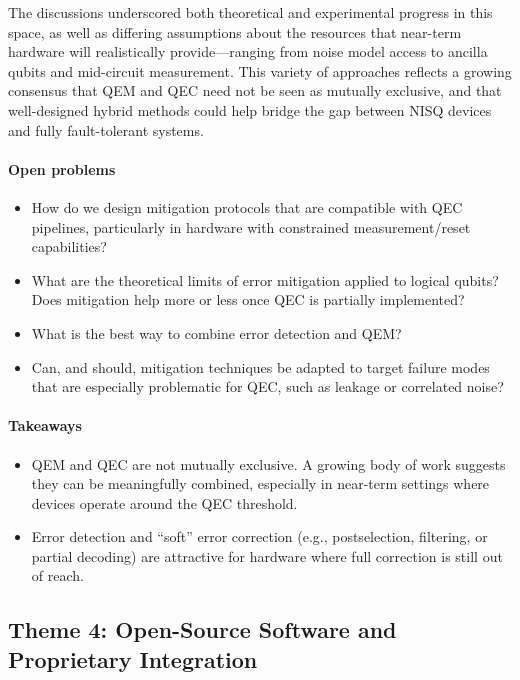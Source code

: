 \documentclass{article}
\begin{document}
The discussions underscored both theoretical and experimental progress in this space, as well as differing assumptions about the resources that near-term hardware will realistically provide—ranging from noise model access to ancilla qubits and mid-circuit measurement.
This variety of approaches reflects a growing consensus that QEM and QEC need not be seen as mutually exclusive, and that well-designed hybrid methods could help bridge the gap between NISQ devices and fully fault-tolerant systems.

\paragraph{Open problems}
\begin{itemize}
    \item How do we design mitigation protocols that are compatible with QEC pipelines, particularly in hardware with constrained measurement/reset capabilities?
    \item What are the theoretical limits of error mitigation applied to logical qubits? Does mitigation help more or less once QEC is partially implemented?
    \item What is the best way to combine error detection and QEM?
    \item Can, and should, mitigation techniques be adapted to target failure modes that are especially problematic for QEC, such as leakage or correlated noise?
\end{itemize}

\paragraph{Takeaways}
\begin{itemize}
    \item QEM and QEC are not mutually exclusive. A growing body of work suggests they can be meaningfully combined, especially in near-term settings where devices operate around the QEC threshold.
    \item Error detection and ``soft'' error correction (e.g., postselection, filtering, or partial decoding) are attractive for hardware where full correction is still out of reach.
\end{itemize}

\subsection*{Theme 4: Open-Source Software and Proprietary Integration}
\end{document}
